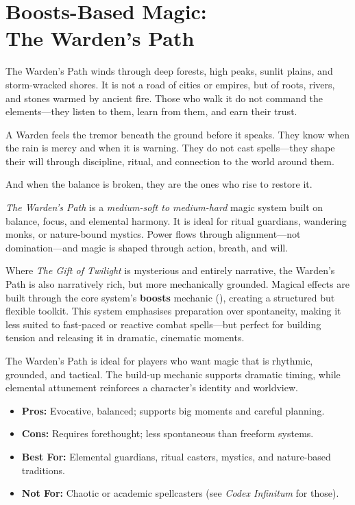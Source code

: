 \section[Boosts-Based Magic: The Warden’s Path]{Boosts-Based Magic:\\ The Warden’s Path}

\begin{Example}{}
    The Warden’s Path winds through deep forests, high peaks, sunlit plains, and storm-wracked shores. It is not a road of cities or empires, but of roots, rivers, and stones warmed by ancient fire. Those who walk it do not command the elements—they listen to them, learn from them, and earn their trust.

    A Warden feels the tremor beneath the ground before it speaks. They know when the rain is mercy and when it is warning. They do not cast spells—they shape their will through discipline, ritual, and connection to the world around them.

    And when the balance is broken, they are the ones who rise to restore it.
\end{Example}

\textit{The Warden’s Path} is a \emph{medium-soft to medium-hard} magic system built on balance, focus, and elemental harmony. It is ideal for ritual guardians, wandering monks, or nature-bound mystics. Power flows through alignment—not domination—and magic is shaped through action, breath, and will.

Where \textit{The Gift of Twilight} is mysterious and entirely narrative, the Warden’s Path is also narratively rich, but more mechanically grounded. Magical effects are built through the core system’s \textbf{boosts} mechanic (), creating a structured but flexible toolkit. This system emphasises preparation over spontaneity, making it less suited to fast-paced or reactive combat spells—but perfect for building tension and releasing it in dramatic, cinematic moments.

\begin{GmTips}
    The Warden’s Path is ideal for players who want magic that is rhythmic, grounded, and tactical. The build-up mechanic supports dramatic timing, while elemental attunement reinforces a character’s identity and worldview.
    \begin{itemize}
        \item \textbf{Pros:} Evocative, balanced; supports big moments and careful planning.
        \item \textbf{Cons:} Requires forethought; less spontaneous than freeform systems.
        \item \textbf{Best For:} Elemental guardians, ritual casters, mystics, and nature-based traditions.
        \item \textbf{Not For:} Chaotic or academic spellcasters (see \textit{Codex Infinitum} for those).
    \end{itemize}
\end{GmTips}

